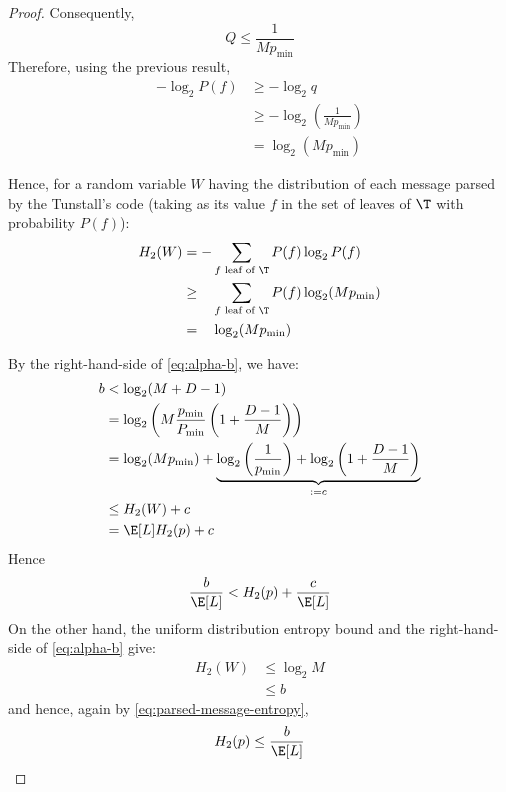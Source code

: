 \documentclass[toc]{../cs-classes/cs-classes}
\begin{document}
\begin{proof}
    Consequently,
    \begin{equation*}
        Q \leq \frac{1}{Mp_{\min}}
    \end{equation*}
    Therefore, using the previous result,
    \begin{equation*}
        \begin{aligned}
            -\log_2P(f) &\geq -\log_2 q\\
            &\geq -\log_2\left(\frac{1}{Mp_{\min}}\right)\\
            &= \log_2(Mp_{\min})
        \end{aligned}
    \end{equation*}

    Hence, for a random variable $W$ having the distribution of each message parsed by the Tunstall's code (taking as its value $f$ in the set of leaves of $\T$ with probability $P(f)$):
    \begin{equation*}
        \begin{aligned}
            H_2(W) &= -\sum_{f \textnormal{ leaf of }\T}P(f)\log_2P(f)\\
            &\geq \phantom{-} \sum_{f \textnormal{ leaf of }\T}P(f)\log_2(Mp_{\min})\\
            &= \phantom{-} \log_2(Mp_{\min})
        \end{aligned}
    \end{equation*}

    By the right-hand-side of \eqref{eq:alpha-b}, we have:
    \begin{equation*}
        \begin{aligned}
            b &< \log_2(M+D-1)\\
            &= \log_2\left(M\frac{p_{\min}}{P_{\min}}\left(1+\frac{D-1}{M}\right)\right)\\
            &= \log_2(Mp_{\min}) + \underbrace{\log_2\left(\frac{1}{p_{\min}}\right) + \log_2\left(1+\frac{D-1}{M}\right)}_{:= c}\\
            &\leq H_2(W) + c\\
            &= \E[L] H_2(p) + c
        \end{aligned}
    \end{equation*}
    Hence
    \begin{equation*}
        \frac{b}{\E[L]} < H_2(p) + \frac{c}{\E[L]}
    \end{equation*}
    On the other hand, the uniform distribution entropy bound and the right-hand-side of \eqref{eq:alpha-b} give:
    \begin{equation*}
        \begin{aligned}
            H_2(W)&\leq\log_2M\\
            &\leq b
        \end{aligned}
    \end{equation*}
    and hence, again by \eqref{eq:parsed-message-entropy},
    \begin{equation*}
        H_2(p)\leq\frac{b}{\E[L]}
    \end{equation*}


\end{proof}
\end{document}
